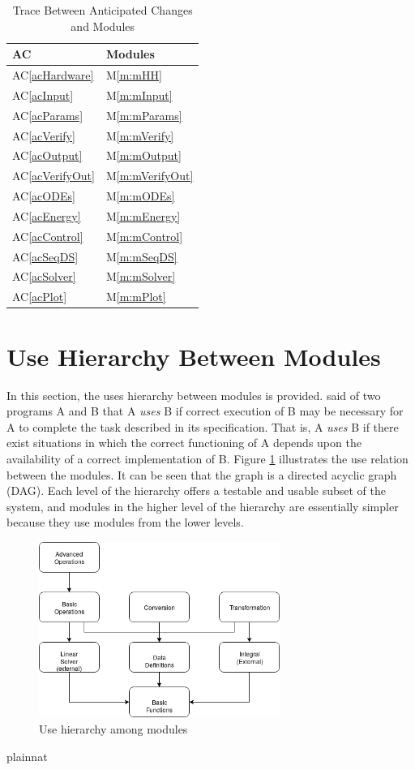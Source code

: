 \documentclass[12pt, titlepage]{article}
\newcommand{\acref}[1]{AC\ref{#1}}
\newcommand{\mref}[1]{M\ref{m:#1}}
\begin{document}
\begin{table}[H]
\centering
\begin{tabular}{p{} p{}}
\toprule
\textbf{AC} & \textbf{Modules}\\
\midrule
\acref{acHardware} & \mref{mHH}\\
\acref{acInput} & \mref{mInput}\\
\acref{acParams} & \mref{mParams}\\
\acref{acVerify} & \mref{mVerify}\\
\acref{acOutput} & \mref{mOutput}\\
\acref{acVerifyOut} & \mref{mVerifyOut}\\
\acref{acODEs} & \mref{mODEs}\\
\acref{acEnergy} & \mref{mEnergy}\\
\acref{acControl} & \mref{mControl}\\
\acref{acSeqDS} & \mref{mSeqDS}\\
\acref{acSolver} & \mref{mSolver}\\
\acref{acPlot} & \mref{mPlot}\\
\bottomrule
\end{tabular}
\caption{Trace Between Anticipated Changes and Modules}
\label{TblACT}
\end{table}

\section{Use Hierarchy Between Modules} \label{SecUse}

In this section, the uses hierarchy between modules is
provided. \citet{Parnas1978} said of two programs A and B that A {\em uses} B if
correct execution of B may be necessary for A to complete the task described in
its specification. That is, A {\em uses} B if there exist situations in which
the correct functioning of A depends upon the availability of a correct
implementation of B.  Figure \ref{FigUH} illustrates the use relation between
the modules. It can be seen that the graph is a directed acyclic graph
(DAG). Each level of the hierarchy offers a testable and usable subset of the
system, and modules in the higher level of the hierarchy are essentially simpler
because they use modules from the lower levels.

\begin{figure}[H]
\centering
\includegraphics[width=0.7\textwidth]{UsesHierarchy.png}
\caption{Use hierarchy among modules}
\label{FigUH}
\end{figure}


 {plainnat}

\end{document}
